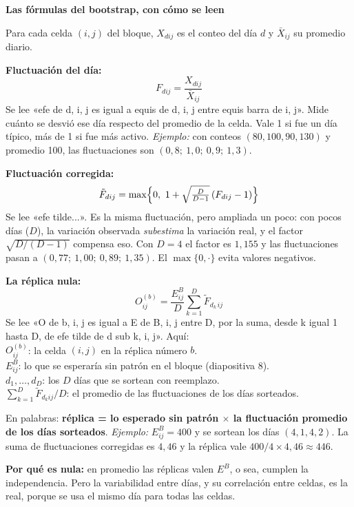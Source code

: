 \documentclass[11pt,a4paper]{article}
\newcommand{\cajainicio}[3]{\par\medskip\noindent
  \begin{lrbox}{\cajabox}\begin{minipage}{\dimexpr\linewidth-2\fboxsep-2\fboxrule\relax}%
  \textbf{\color{#1}#3}\par\smallskip}
\newcommand{\cajafin}[2]{\end{minipage}\end{lrbox}\fcolorbox{#1}{#2}{\usebox{\cajabox}}\par\medskip}
\newenvironment{nota}[1]{\cajainicio{acc}{acc!7}{#1}}{\cajafin{acc}{acc!7}}
\begin{document}
\begin{nota}{Las fórmulas del bootstrap, con cómo se leen}
Para cada celda $(i,j)$ del bloque, $X_{dij}$ es el conteo del día $d$ y $\bar X_{ij}$ su promedio diario.

\textbf{Fluctuación del día:}
\[ F_{dij}=\frac{X_{dij}}{\bar X_{ij}} \]
Se lee «efe de d, i, j es igual a equis de d, i, j entre equis barra de i, j». Mide cuánto se desvió ese día respecto del promedio de la celda. Vale 1 si fue un día típico, más de 1 si fue más activo. \textit{Ejemplo:} con conteos $(80,100,90,130)$ y promedio 100, las fluctuaciones son $(0{,}8;\ 1{,}0;\ 0{,}9;\ 1{,}3)$.

\textbf{Fluctuación corregida:}
\[ \tilde F_{dij}=\max\Bigl\{0,\ 1+\sqrt{\tfrac{D}{D-1}}\,(F_{dij}-1)\Bigr\} \]
Se lee «efe tilde...». Es la misma fluctuación, pero ampliada un poco: con pocos días ($D$), la variación observada \emph{subestima} la variación real, y el factor $\sqrt{D/(D-1)}$ compensa eso. Con $D=4$ el factor es $1{,}155$ y las fluctuaciones pasan a $(0{,}77;\ 1{,}00;\ 0{,}89;\ 1{,}35)$. El $\max\{0,\cdot\}$ evita valores negativos.

\textbf{La réplica nula:}
\[ O^{(b)}_{ij}=\frac{E^B_{ij}}{D}\sum_{k=1}^{D}\tilde F_{d_k\,ij} \]
Se lee «O de b, i, j es igual a E de B, i, j entre D, por la suma, desde k igual 1 hasta D, de efe tilde de d sub k, i, j». Aquí:\\
$O^{(b)}_{ij}$: la celda $(i,j)$ en la réplica número $b$.\\
$E^B_{ij}$: lo que se esperaría sin patrón en el bloque (diapositiva 8).\\
$d_1,\dots,d_D$: los $D$ días que se sortean con reemplazo.\\
$\sum_{k=1}^{D}\tilde F_{d_k ij}/D$: el promedio de las fluctuaciones de los días sorteados.

En palabras: \textbf{réplica = lo esperado sin patrón $\times$ la fluctuación promedio de los días sorteados}. \textit{Ejemplo:} $E^B_{ij}=400$ y se sortean los días $(4,1,4,2)$. La suma de fluctuaciones corregidas es $4{,}46$ y la réplica vale $400/4\times 4{,}46\approx 446$.

\textbf{Por qué es nula:} en promedio las réplicas valen $E^B$, o sea, cumplen la independencia. Pero la variabilidad entre días, y su correlación entre celdas, es la real, porque se usa el mismo día para todas las celdas.
\end{nota}
\end{document}
